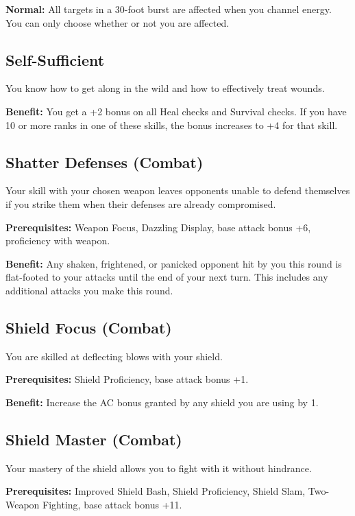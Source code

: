 \textbf{Normal:} All targets in a 30-foot burst are affected when you channel energy. You can only choose whether or not you are affected.
				
\subsection{Self-Sufficient}

				
You know how to get along in the wild and how to effectively treat wounds.
				
\textbf{Benefit:} You get a +2 bonus on all Heal checks and Survival checks. If you have 10 or more ranks in one of these skills, the bonus increases to +4 for that skill.
				
\subsection{Shatter Defenses (Combat)}

				
Your skill with your chosen weapon leaves opponents unable to defend themselves if you strike them when their defenses are already compromised.
				
\textbf{Prerequisites:} Weapon Focus, Dazzling Display, base attack bonus +6, proficiency with weapon.
				
\textbf{Benefit:} Any shaken, frightened, or panicked opponent hit by you this round is flat-footed to your attacks until the end of your next turn. This includes any additional attacks you make this round.
				
\subsection{Shield Focus (Combat)}

				
You are skilled at deflecting blows with your shield.
				
\textbf{Prerequisites:} Shield Proficiency, base attack bonus +1.
				
\textbf{Benefit:} Increase the AC bonus granted by any shield you are using by 1.
				
\subsection{Shield Master (Combat)}

				
Your mastery of the shield allows you to fight with it without hindrance.
				
\textbf{Prerequisites:} Improved Shield Bash, Shield Proficiency, Shield Slam, Two-Weapon Fighting, base attack bonus +11.
				
